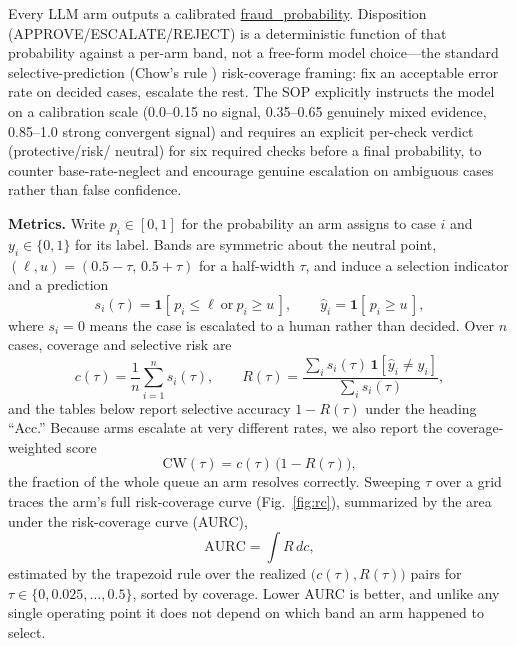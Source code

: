 \documentclass[]{ieeeaccess}
\newcommand{\code}[1]{\url{#1}}
\begin{document}
Every LLM arm outputs a calibrated \code{fraud_probability}. Disposition
(APPROVE/ESCALATE/REJECT) is a deterministic function of that probability
against a per-arm band, not a free-form model choice---the standard
selective-prediction (Chow's rule \cite{chow1970}) risk-coverage framing:
fix an acceptable error rate on decided cases, escalate the rest. The SOP
explicitly instructs the model on a calibration scale (0.0--0.15 no
signal, 0.35--0.65 genuinely mixed evidence, 0.85--1.0 strong convergent
signal) and requires an explicit per-check verdict (protective/risk/%
neutral) for six required checks before a final probability, to counter
base-rate-neglect and encourage genuine escalation on ambiguous cases
rather than false confidence.

\textbf{Metrics.} Write $p_i \in [0,1]$ for the probability an arm
assigns to case $i$ and $y_i \in \{0,1\}$ for its label. Bands are
symmetric about the neutral point, $(\ell, u) = (0.5 - \tau,\,
0.5 + \tau)$ for a half-width $\tau$, and induce a selection indicator
and a prediction
\begin{equation}\label{eq:select}
s_i(\tau) = \mathbf{1}[\,p_i \le \ell \ \text{or} \ p_i \ge u\,],
\qquad
\hat{y}_i = \mathbf{1}[\,p_i \ge u\,],
\end{equation}
where $s_i = 0$ means the case is escalated to a human rather than
decided. Over $n$ cases, coverage and selective risk are
\begin{equation}\label{eq:risk}
c(\tau) = \frac{1}{n}\sum_{i=1}^{n} s_i(\tau),
\qquad
R(\tau) = \frac{\sum_{i} s_i(\tau)\,\mathbf{1}[\hat{y}_i \neq y_i]}
               {\sum_{i} s_i(\tau)},
\end{equation}
and the tables below report selective accuracy $1 - R(\tau)$ under the
heading ``Acc.'' Because arms escalate at very different rates, we also
report the coverage-weighted score
\begin{equation}\label{eq:covwt}
\mathrm{CW}(\tau) = c(\tau)\,\bigl(1 - R(\tau)\bigr),
\end{equation}
the fraction of the whole queue an arm resolves correctly. Sweeping
$\tau$ over a grid traces the arm's full risk-coverage curve
(Fig.~\ref{fig:rc}), summarized by the area under the risk-coverage
curve (AURC),
\begin{equation}\label{eq:aurc}
\mathrm{AURC} = \int R\,dc,
\end{equation}
estimated by the trapezoid rule over the realized
$\bigl(c(\tau), R(\tau)\bigr)$ pairs for $\tau \in \{0, 0.025, \ldots,
0.5\}$, sorted by coverage. Lower AURC is better, and unlike any single
operating point it does not depend on which band an arm happened to
select.
\end{document}
